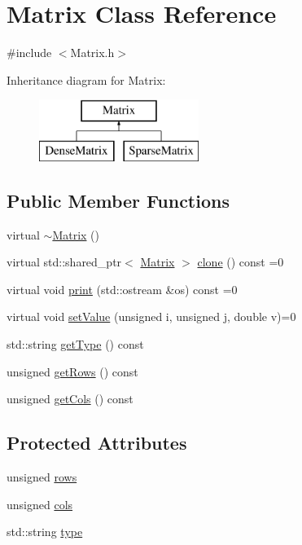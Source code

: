 \hypertarget{class_matrix}{}\section{Matrix Class Reference}
\label{class_matrix}


{\ttfamily \#include $<$Matrix.\+h$>$}

Inheritance diagram for Matrix\+:\begin{figure}[H]
\begin{center}
\leavevmode
\includegraphics[height=2.000000cm]{class_matrix}
\end{center}
\end{figure}
\subsection*{Public Member Functions}
\begin{DoxyCompactItemize}
\item 
virtual \mbox{\hyperlink{class_matrix_a9b1c3627f573d78a2f08623fdfef990f}{$\sim$\+Matrix}} ()
\item 
virtual std\+::shared\+\_\+ptr$<$ \mbox{\hyperlink{class_matrix}{Matrix}} $>$ \mbox{\hyperlink{class_matrix_aae61e88849e7c16bc9fabf0ad5bd20f0}{clone}} () const =0
\item 
virtual void \mbox{\hyperlink{class_matrix_a0003db86d2ce908119e082b9c35a4fb3}{print}} (std\+::ostream \&os) const =0
\item 
virtual void \mbox{\hyperlink{class_matrix_a7b7ac64a3cbb38f4d661ec3a2fddf5f5}{set\+Value}} (unsigned i, unsigned j, double v)=0
\item 
std\+::string \mbox{\hyperlink{class_matrix_abc5416c425819f433917650776b86011}{get\+Type}} () const
\item 
unsigned \mbox{\hyperlink{class_matrix_a9eb68e94c4ac5213e97188d99a21da10}{get\+Rows}} () const
\item 
unsigned \mbox{\hyperlink{class_matrix_aa716da545a2043ad41ee276806976883}{get\+Cols}} () const
\end{DoxyCompactItemize}
\subsection*{Protected Attributes}
\begin{DoxyCompactItemize}
\item 
unsigned \mbox{\hyperlink{class_matrix_ac1345e89dbffc411f5766c11fc8ebb6a}{rows}}
\item 
unsigned \mbox{\hyperlink{class_matrix_af477fcaeda55b1d5b8ace1be7773c209}{cols}}
\item 
std\+::string \mbox{\hyperlink{class_matrix_a3f9973bd9a7ad102959ba74e50631db9}{type}}
\end{DoxyCompactItemize}
